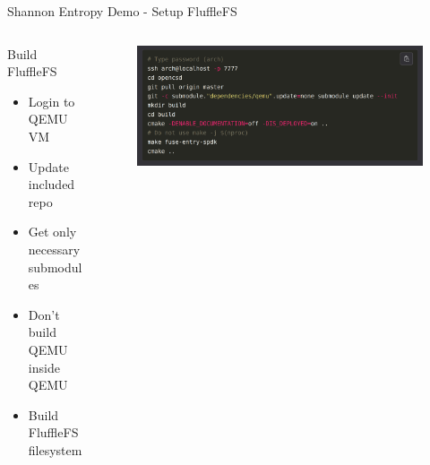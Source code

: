 \documentclass[aspectratio=169, notes]{beamer}
\begin{document}
\begin{frame}{Shannon Entropy Demo - Setup FluffleFS}
        \begin{columns}
            \begin{column}{0.40\textwidth}
                \footnotesize
                Build FluffleFS
                \begin{itemize}
                    \item Login to QEMU VM
                    \item Update included repo
                    \item Get only necessary submodules
                    \item Don't build QEMU inside QEMU
                    \item Build FluffleFS filesystem
                \end{itemize}
            \end{column}
            \begin{column}{0.60\textwidth}
                \begingroup
                \small
                \begin{figure}
                    \centering
                    \includegraphics[width=1\textwidth]{resources/images/qemu-setup2.png}
                \end{figure}
                \endgroup
            \end{column}
        \end{columns}
\end{frame}
\end{document}
